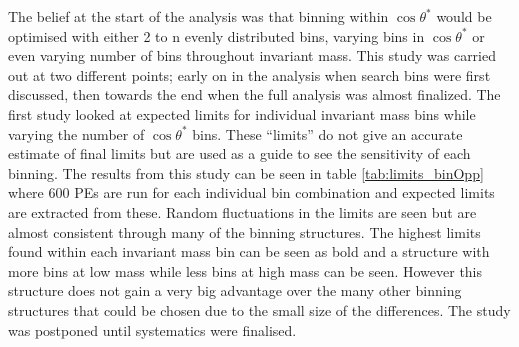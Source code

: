     The belief at the start of the analysis was that binning within $\cos{\theta^{*}}$ would be optimised with either 2 to n evenly distributed bins, varying bins in $\cos{\theta^{*}}$ or even varying number of bins throughout invariant mass. 
    This study was carried out at two different points; early on in the analysis when search bins were first discussed, then towards the end when the full analysis was almost finalized. The first study looked at expected limits for individual invariant mass bins while varying the number of $\cos{\theta^{*}}$ bins. These ``limits'' do not give an accurate estimate of final limits but are used as a guide to see the sensitivity of each binning. The results from this study can be seen in table \ref{tab:limits_binOpp} where 600 PEs are run for each individual bin combination and expected limits are extracted from these. 
    Random fluctuations in the limits are seen but are almost consistent through many of the binning structures. The highest limits found within each invariant mass bin can be seen as bold and a structure with more bins at low mass while less bins at high mass can be seen. However this structure does not gain a very big advantage over the many other binning structures that could be chosen due to the small size of the differences. The study was postponed until systematics were finalised. 

